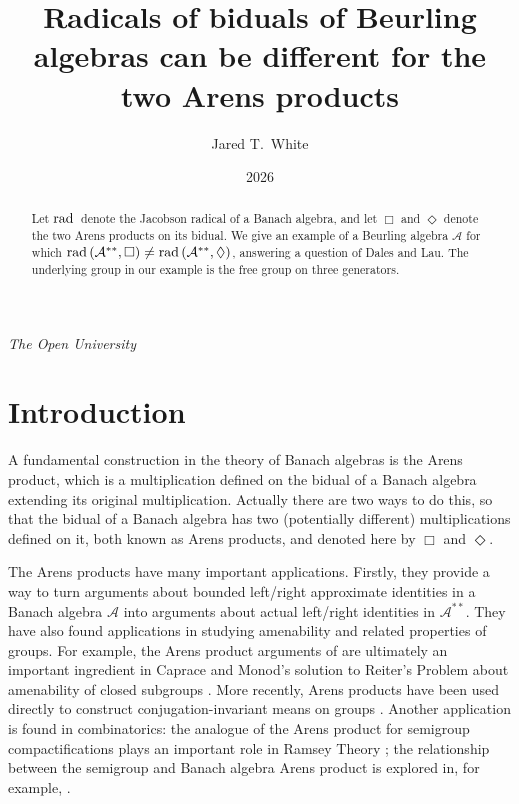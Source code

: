 \documentclass[twoside,11pt]{amsart}
\title[Radicals of Biduals]{Radicals of biduals of Beurling algebras can be different for the two Arens products}
\numberwithin{equation}{section}
\theoremstyle{definition}
\newcommand {\A}{\mathcal A}
\newcommand{\rad}{{\rm rad\,}}
\newcommand{\1}{\mathbbm{1}}
\begin{document}
	
	
	\author[J.\ T.\  White]{Jared T.\ White}
	\address{
		Jared T. White, School of Mathematics and Statistics, The Open University, Walton Hall, Milton Keynes MK7 6AA, United Kingdom.}
	
	
	
	\date{2026}
	
	\maketitle
	
	\begin{center}
		\textit{The Open University}
	\end{center}
	
	\begin{abstract}
		Let $\rad$ denote the Jacobson radical of a Banach algebra, and let $\Box$ and $\Diamond$ denote the two Arens products on its bidual. We give an example of a Beurling algebra $\A$ for which $\rad(\A^{**}, \Box) \neq \rad(\A^{**}, \Diamond)$, answering a question of Dales and Lau. The underlying group in our example is the free group on three generators.
	\end{abstract}
	
	\section{Introduction}
	
	A fundamental construction in the theory of Banach algebras is the Arens product, which is a multiplication defined on the bidual of a Banach algebra extending its original multiplication. Actually there are two ways to do this, so that the bidual of a Banach algebra has two (potentially different) multiplications defined on it, both known as Arens products, and denoted here by $\Box$ and $\Diamond$. 
	
	The Arens products have many important applications. Firstly, they provide a way to turn arguments about bounded left/right approximate identities in a Banach algebra $\A$ into arguments about actual left/right identities in $\A^{**}$. They have also found applications in studying amenability and related properties of groups. For example, the Arens product arguments of \cite{F90} are ultimately an important ingredient in Caprace and Monod's solution to Reiter's Problem about amenability of closed subgroups \cite{CM}. More recently, Arens products have been used directly to construct conjugation-invariant means on groups \cite{DTW}. Another application is found in combinatorics: the analogue of the Arens product for semigroup compactifications plays an important role in Ramsey Theory \cite{HS}; the relationship between the semigroup and Banach algebra Arens product is explored in, for example, \cite{DLS, DS22, DSZZ}.
	
\end{document}
